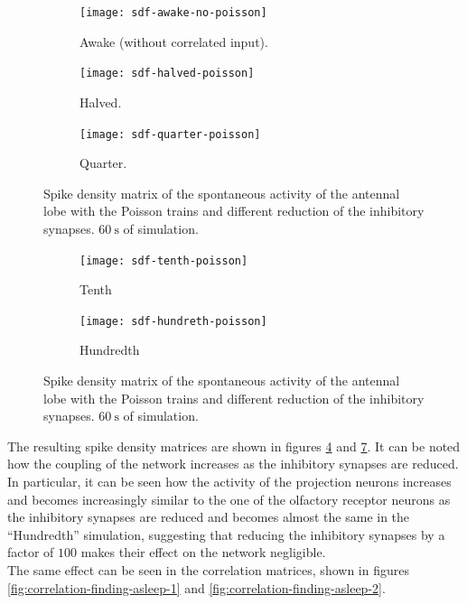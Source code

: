 \begin{figure}
  \begin{subfigure}[t]{0.5\textwidth}
    \centering
    \texttt{[image: sdf-awake-no-poisson]}
    \caption{Awake (without correlated input).}
    \label{fig:sdf-awake-poisson-finding-asleep}
  \end{subfigure}
  \begin{subfigure}[t]{0.5\textwidth}
    \centering
    \texttt{[image: sdf-halved-poisson]}
    \caption{Halved.}
    \label{fig:sdf-halved-poisson-finding-asleep}
  \end{subfigure}
  \begin{subfigure}[t]{\textwidth}
    \centering
    \texttt{[image: sdf-quarter-poisson]}
    \caption{Quarter.}
    \label{fig:sdf-quarter-poisson-finding-asleep}
  \end{subfigure}
  \caption{Spike density matrix of the spontaneous activity of the antennal lobe with the Poisson trains and different reduction of the inhibitory synapses. $\SI{60}{\second}$ of simulation.}
  \label{fig:sdf-finding-asleep-1}
\end{figure}

\begin{figure}
  \begin{subfigure}[t]{0.5\textwidth}
    \centering
    \texttt{[image: sdf-tenth-poisson]}
    \caption{Tenth}
    \label{fig:sdf-tenth-poisson-finding-asleep}
  \end{subfigure}
  \begin{subfigure}[t]{0.5\textwidth}
    \texttt{[image: sdf-hundreth-poisson]}
    \caption{Hundredth}
    \label{fig:sdf-hundredth-poisson-finding-asleep}
  \end{subfigure}
  \caption{Spike density matrix of the spontaneous activity of the antennal lobe with the Poisson trains and different reduction of the inhibitory synapses. $\SI{60}{\second}$ of simulation.}
  \label{fig:sdf-finding-asleep-2}
\end{figure}

The resulting spike density matrices are shown in figures \ref{fig:sdf-finding-asleep-1} and \ref{fig:sdf-finding-asleep-2}.
It can be noted how the coupling of the network increases as the inhibitory synapses are reduced.
In particular, it can be seen how the activity of the projection neurons increases and becomes increasingly similar to the one of the olfactory receptor neurons as the inhibitory synapses are reduced and becomes almost the same in the ``Hundredth'' simulation, suggesting that reducing the inhibitory synapses by a factor of $100$ makes their effect on the network negligible.\\
The same effect can be seen in the correlation matrices, shown in figures \ref{fig:correlation-finding-asleep-1} and \ref{fig:correlation-finding-asleep-2}.

